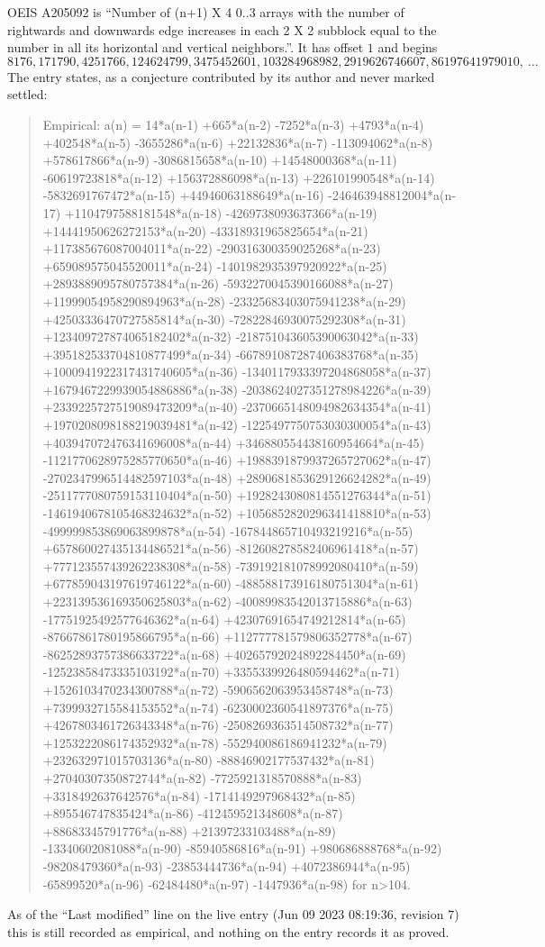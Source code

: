\documentclass[11pt,a4paper]{article}
\theoremstyle{plain}
\theoremstyle{definition}
\begin{document}
OEIS A205092 is ``Number of (n+1) X 4 0..3 arrays with the number of rightwards and downwards edge increases in each 2 X 2 subblock equal to the number in all its horizontal and vertical neighbors.''. It has offset $1$ and begins
\[
8176, 171790, 4251766, 124624799, 3475452601, 103284968982, 2919626746607, 86197641979010,\ \dots
\]
The entry states, as a conjecture contributed by its author and never marked settled:
\begin{quote}
Empirical: a(n) = 14*a(n-1) +665*a(n-2) -7252*a(n-3) +4793*a(n-4) +402548*a(n-5) -3655286*a(n-6) +22132836*a(n-7) -113094062*a(n-8) +578617866*a(n-9) -3086815658*a(n-10) +14548000368*a(n-11) -60619723818*a(n-12) +156372886098*a(n-13) +226101990548*a(n-14) -5832691767472*a(n-15) +44946063188649*a(n-16) -246463948812004*a(n-17) +1104797588181548*a(n-18) -4269738093637366*a(n-19) +14441950626272153*a(n-20) -43318931965825654*a(n-21) +117385676087004011*a(n-22) -290316300359025268*a(n-23) +659089575045520011*a(n-24) -1401982935397920922*a(n-25) +2893889095780757384*a(n-26) -5932270045390166088*a(n-27) +11999054958290894963*a(n-28) -23325683403075941238*a(n-29) +42503336470727585814*a(n-30) -72822846930075292308*a(n-31) +123409727874065182402*a(n-32) -218751043605390063042*a(n-33) +395182533704810877499*a(n-34) -667891087287406383768*a(n-35) +1000941922317431740605*a(n-36) -1340117933397204868058*a(n-37) +1679467229939054886886*a(n-38) -2038624027351278984226*a(n-39) +2339225727519089473209*a(n-40) -2370665148094982634354*a(n-41) +1970208098188219039481*a(n-42) -1225497750753030300054*a(n-43) +403947072476341696008*a(n-44) +346880554438160954664*a(n-45) -1121770628975285770650*a(n-46) +1988391879937265727062*a(n-47) -2702347996514482597103*a(n-48) +2890681853629126624282*a(n-49) -2511777080759153110404*a(n-50) +1928243080814551276344*a(n-51) -1461940678105468324632*a(n-52) +1056852820296341418810*a(n-53) -499999853869063899878*a(n-54) -167844865710493219216*a(n-55) +657860027435134486521*a(n-56) -812608278582406961418*a(n-57) +777123557439262238308*a(n-58) -739192181078992080410*a(n-59) +677859043197619746122*a(n-60) -488588173916180751304*a(n-61) +223139536169350625803*a(n-62) -40089983542013715886*a(n-63) -17751925492577646362*a(n-64) +42307691654749212814*a(n-65) -87667861780195866795*a(n-66) +112777781579806352778*a(n-67) -86252893757386633722*a(n-68) +40265792024892284450*a(n-69) -12523858473335103192*a(n-70) +3355339926480594462*a(n-71) +1526103470234300788*a(n-72) -5906562063953458748*a(n-73) +7399932715584153552*a(n-74) -6230002360541897376*a(n-75) +4267803461726343348*a(n-76) -2508269363514508732*a(n-77) +1253222086174352932*a(n-78) -552940086186941232*a(n-79) +232632971015703136*a(n-80) -88846902177537432*a(n-81) +27040307350872744*a(n-82) -7725921318570888*a(n-83) +3318492637642576*a(n-84) -1714149297968432*a(n-85) +895546747835424*a(n-86) -412459521348608*a(n-87) +88683345791776*a(n-88) +21397233103488*a(n-89) -13340602081088*a(n-90) -85940586816*a(n-91) +980686888768*a(n-92) -98208479360*a(n-93) -23853444736*a(n-94) +4072386944*a(n-95) -65899520*a(n-96) -62484480*a(n-97) -1447936*a(n-98) for n>104.
\end{quote}
As of the ``Last modified'' line on the live entry (Jun 09 2023 08:19:36, revision 7) this is still
recorded as empirical, and nothing on the entry records it as proved.
\end{document}
